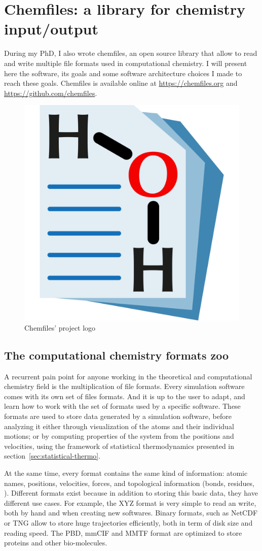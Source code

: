 \documentclass[thesis]{subfiles}
\begin{document}
\OnlyInSubfile{\appendix}
\chapter{Chemfiles: a library for chemistry input/output}
\label{sec:chemfiles}

During my PhD, I also wrote chemfiles, an open source library that allow to read
and write multiple file formats used in computational chemistry. I will present
here the software, its goals and some software architecture choices I made to
reach these goals. Chemfiles is available online at \url{https://chemfiles.org}
and \url{https://github.com/chemfiles}.

\vfill
\begin{figure}[H]
    \centering
    \includegraphics[width=.3\textwidth]{figures/images/chemfiles-logo}
    \caption{Chemfiles' project logo}
    \label{fig:chemfiles:logo}
\end{figure}
\vfill

\newpage
\section{The computational chemistry formats zoo}

A recurrent pain point for anyone working in the theoretical and computational
chemistry field is the multiplication of file formats. Every simulation software
comes with its own set of files formats. And it is up to the user to adapt, and
learn how to work with the set of formats used by a specific software. These
formats are used to store data generated by a simulation software, before
analyzing it either through visualization of the atoms and their individual
motions; or by computing properties of the system from the positions and
velocities, using the framework of statistical thermodynamics presented in
section~\ref{sec:statistical-thermo}.

At the same time, every format contains the same kind of information: atomic
names, positions, velocities, forces, and topological information (bonds,
residues, \etc). Different formats exist because in addition to storing this
basic data, they have different use cases. For example, the XYZ format is very
simple to read an write, both by hand and when creating new softwares. Binary
formats, such as NetCDF or TNG allow to store huge trajectories efficiently,
both in term of disk size and reading speed. The PBD, mmCIF and MMTF format are
optimized to store proteins and other bio-molecules.
\end{document}
